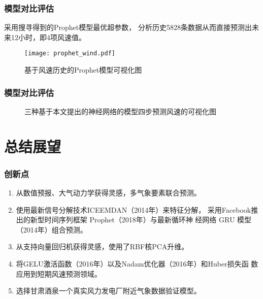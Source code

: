 \documentclass[14pt, AutoFakeBold]{ppt}
\begin{document}
\begin{frame}
  \frametitle{模型对比评估}
  采用搜寻得到的Prophet模型最优超参数，
  分析历史5828条数据从而直接预测出未来12小时，即4项风速值。
  \begin{figure}[H]
    \centering
      \texttt{[image: prophet\_wind.pdf]}
      \caption{基于风速历史的Prophet模型可视化图}
      \label{fig_prophet_wind}
  \end{figure}
\end{frame}

\begin{frame}
  \frametitle{模型对比评估}
  \begin{figure}[H]
    \centering
    \caption{三种基于本文提出的神经网络的模型四步预测风速的可视化图}
    \label{fig_gru_predict_test}
  \end{figure}
\end{frame}

\section{总结展望}

\begin{frame}
  \frametitle{创新点}
  \begin{enumerate}
    \item 从数值预报、大气动力学获得灵感，多气象要素联合预测。
    \item 使用最新信号分解技术ICEEMDAN（2014年）来特征分解，
    采用Facebook推出的新型时间序列框架 Prophet（2018年）与最新循环神
    经网络 GRU 模型（2014年）组合预测。
    \item 从支持向量回归机获得灵感，使用了RBF核PCA升维。
    \item 将GELU激活函数（2016年）以及Nadam优化器（2016年）和Huber损失函
    数应用到短期风速预测领域。
    \item 选择甘肃酒泉一个真实风力发电厂附近气象数据验证模型。
  \end{enumerate}
\end{frame}
\end{document}
